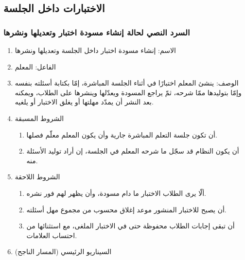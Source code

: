 \subsection{الاختبارات داخل الجلسة}

\subsubsection{السرد النصي لحالة إنشاء مسودة اختبار وتعديلها ونشرها}
\label{subsubsec:uc-quiz-compose}

\begin{enumerate}
  \item الاسم: إنشاء مسودة اختبار داخل الجلسة وتعديلها ونشرها
  \item الفاعل: المعلم
  \item الوصف: ينشئ المعلم اختبارًا في أثناء الجلسة المباشرة، إمّا بكتابة أسئلته بنفسه وإمّا بتوليدها ممّا شرحه، ثمّ يراجع المسودة ويعدّلها وينشرها على الطلاب، ويمكنه بعد النشر أن يمدّد مهلتها أو يغلق الاختبار أو يلغيه.
  \item الشروط المسبقة
  \begin{enumerate}
    \item أن تكون جلسة التعلم المباشرة جارية وأن يكون المعلم معلّم فصلها.
    \item أن يكون النظام قد سجّل ما شرحه المعلم في الجلسة، إن أراد توليد الأسئلة منه.
  \end{enumerate}
  \item الشروط اللاحقة
  \begin{enumerate}
    \item ألّا يرى الطلاب الاختبار ما دام مسودة، وأن يظهر لهم فور نشره.
    \item أن يصبح للاختبار المنشور موعد إغلاق محسوب من مجموع مهل أسئلته.
    \item أن تبقى إجابات الطلاب محفوظة حتى في الاختبار الملغى، مع استثنائها من احتساب العلامات.
  \end{enumerate}
  \item السيناريو الرئيسي (المسار الناجح)
\end{enumerate}

